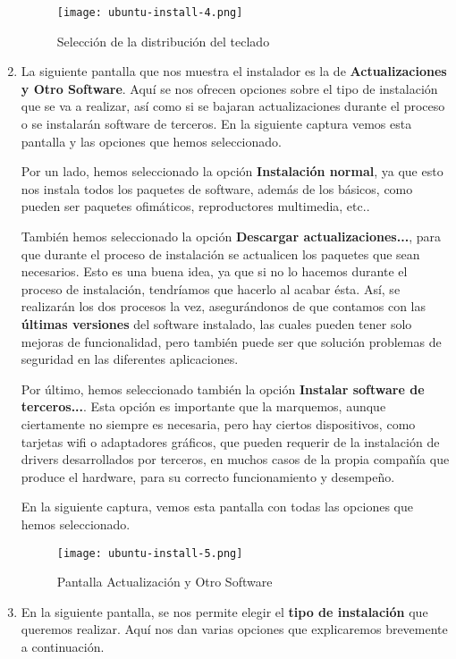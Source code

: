 \begin{enumerate}
    \begin{figure}[H]
        \centering
        \texttt{[image: ubuntu-install-4.png]}
        \caption{Selección de la distribución del teclado}
    \end{figure}

    \item La siguiente pantalla que nos muestra el instalador es la de \textbf{Actualizaciones y Otro Software}. Aquí se nos ofrecen opciones sobre el tipo de instalación que se va a realizar, así como si se bajaran actualizaciones durante el proceso o se instalarán software de terceros. En la siguiente captura vemos esta pantalla y las opciones que hemos seleccionado.

    Por un lado, hemos seleccionado la opción \textbf{Instalación normal}, ya que esto nos instala todos los paquetes de software, además de los básicos, como pueden ser paquetes ofimáticos, reproductores multimedia, etc..

    También hemos seleccionado la opción \textbf{Descargar actualizaciones...}, para que durante el proceso de instalación se actualicen los paquetes que sean necesarios. Esto es una buena idea, ya que si no lo hacemos durante el proceso de instalación, tendríamos que hacerlo al acabar ésta. Así, se realizarán los dos procesos la vez, asegurándonos de que contamos con las \textbf{últimas versiones} del software instalado, las cuales pueden tener solo mejoras de funcionalidad, pero también puede ser que solución problemas de seguridad en las diferentes aplicaciones.

    Por último, hemos seleccionado también la opción \textbf{Instalar software de terceros...}. Esta opción es importante que la marquemos, aunque ciertamente no siempre es necesaria, pero hay ciertos dispositivos, como tarjetas wifi o adaptadores gráficos, que pueden requerir de la instalación de drivers desarrollados por terceros, en muchos casos de la propia compañía que produce el hardware, para su correcto funcionamiento y desempeño.

    En la siguiente captura, vemos esta pantalla con todas las opciones que hemos seleccionado.

    \begin{figure}[H]
        \centering
        \texttt{[image: ubuntu-install-5.png]}
        \caption{Pantalla Actualización y Otro Software}
    \end{figure}

    \item En la siguiente pantalla, se nos permite elegir el \textbf{tipo de instalación} que queremos realizar. Aquí nos dan varias opciones que explicaremos brevemente a continuación.


\end{enumerate}
